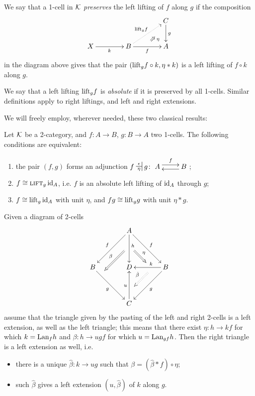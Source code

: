 \begin{definition}
We say that a 1-cell in $\mathcal{K}$ \emph{preserves} the left lifting of $f$ along $g$ if the composition
\[
\xymatrix@C=1.4cm{&& C\ar[d]^g \\ X \ar[r]_k & B\ar[r]_f \ar@{.>}[ur]^{\leeft_gf} & \ar@{}[ul]|(.3){\Nearrow\eta} A}
\]
in the diagram above gives that the pair $(\text{lift}_gf \circ k, \eta * k)$ is a left lifting of $f\circ k$ along $g$.

We say that a left lifting $\text{lift}_gf$ is \emph{absolute} if it is preserved by all 1-cells. Similar definitions apply to right liftings, and left and right extensions.
\end{definition}
\begin{remark}

\end{remark}
We will freely employ, wherever needed, these two classical results:
\begin{proposition}\label{formal_char_of_adjoints}
Let $\mathcal{K}$ be a 2-category, and $f \colon A\to B$, $g\colon B\to A$ two 1-cells. The following conditions are equivalent:
\begin{enumerate}
	\item the pair $(f,g)$ forms an adjunction $f\adjunct{\epsilon}{\eta}g\colon \xymatrix{A \ar@<3pt>[r]^f & B \ar@<3pt>[l]}$;
	\item $f\cong \textsc{lift}_g \operatorname{id}_A$, i.e. $f$ is an absolute left lifting of $\operatorname{id}_A$ through $g$;
	\item $f\cong \text{lift}_g \operatorname{id}_A$ with unit $\eta$, and $fg\cong \text{lift}_gg$ with unit $\eta *g$.
\end{enumerate}
\end{proposition}
\begin{proposition}
Given a diagram of 2-cells
\[
\xymatrix@!=1cm{
\ar@{=>}(16,-10);(6,-20)_\beta
\ar@{=>}(21,-10);(27,-16)^\eta
\ar@{:>}(28,-21);(21,-28)_{\hat\beta}
&A \ar[dr]^f\ar[dl]_f\ar[d]^(.4)h&\\
B\ar[dr]_g&D&B\ar[dl]^g\ar[l]_(.4)k\\
&C\ar[u]^u&
}
\]
assume that the triangle given by the pasting of the left and right 2-cells is a left extension, as well as the left triangle; this means that there exist $\eta \colon h \to kf$ for which $k=\text{Lan}_fh$ and $\beta \colon h \to ugf$ for which $u=\text{Lan}_{gf}h$. Then the right triangle is a left extension as well, i.e.
\begin{itemize}
	\item there is a unique $\hat \beta : k \to ug$ such that $\beta = (\hat \beta * f) \circ \eta$;
	\item such $\hat\beta$ gives a left extension $(u,\hat\beta)$ of $k$ along $g$.
\end{itemize}

\end{proposition}
